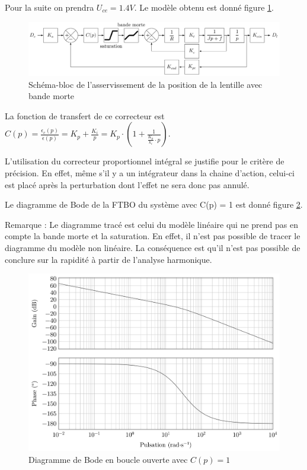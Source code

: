 
Pour la suite on prendra $U_{ce}=1.4V$. Le modèle obtenu est donné figure \ref{img17}.

\begin{figure}[!h]
\centering\includegraphics[width=0.9\linewidth]{img/figure_17}
 \caption{Schéma-bloc de l'asservissement de la position de la lentille avec bande morte}
 \label{img17}
\end{figure}

La fonction de transfert de ce correcteur est $C(p)=\frac{\epsilon_c(p)}{\epsilon(p)}=K_p+\frac{K_i}{p}=K_p\cdot\left(1+\frac{1}{\frac{K_p}{k_i}\cdot p}\right)$.


L'utilisation du correcteur proportionnel intégral se justifie pour le critère de précision. En effet, même s'il y a un intégrateur dans la chaine d'action, celui-ci est placé après la perturbation dont l'effet ne sera donc pas annulé.

Le diagramme de Bode de la FTBO du système avec C(p) = 1 est donné figure \ref{img18}.

Remarque : Le diagramme tracé est celui du modèle linéaire qui ne prend pas en compte la bande morte et la saturation. En effet, il n'est pas possible de tracer le diagramme du modèle non linéaire. La conséquence est qu'il n'est pas possible de conclure sur la rapidité à partir de l'analyse harmonique.

\begin{figure}[!h]
\centering\includegraphics[width=0.9\linewidth]{img/figure_18}
 \caption{Diagramme de Bode en boucle ouverte avec $C(p)=1$}
 \label{img18}
\end{figure}


